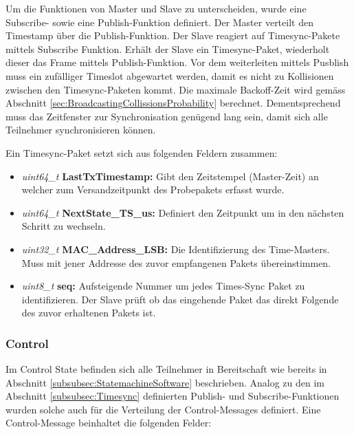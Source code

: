 Um die Funktionen von Master und Slave zu unterscheiden, wurde eine Subscribe- sowie eine Publish-Funktion definiert.
Der Master verteilt den Timestamp über die Publish-Funktion.
Der Slave reagiert auf Timesync-Pakete mittels Subscribe Funktion.
Erhält der Slave ein Timesync-Paket, wiederholt dieser das Frame mittels Publish-Funktion.
Vor dem weiterleiten mittels Pusblish muss ein zufälliger Timeslot abgewartet werden, damit es nicht zu Kollisionen zwischen den Timesync-Paketen kommt.
Die maximale Backoff-Zeit wird gemäss Abschnitt \ref{sec:BroadcastingCollissionsProbability} berechnet.
Dementsprechend muss das Zeitfenster zur Synchronisation genügend lang sein, damit sich alle Teilnehmer synchronisieren können.

Ein Timesync-Paket setzt sich aus folgenden Feldern zusammen: 

\begin{itemize}
\item \textit{uint64\_t} \textbf{LastTxTimestamp:}
	Gibt den Zeitstempel (Master-Zeit) an welcher zum Versandzeitpunkt des Probepakets erfasst wurde.
\item \textit{uint64\_t} \textbf{NextState\_TS\_us:}
	Definiert den Zeitpunkt um in den nächsten Schritt zu wechseln.
\item \textit{uint32\_t} \textbf{MAC\_Address\_LSB:}
	Die Identifizierung des Time-Masters. Muss mit jener Addresse des zuvor empfangenen Pakets übereinstimmen.
\item \textit{uint8\_t} \textbf{seq:}
	Aufsteigende Nummer um jedes Times-Sync Paket zu identifizieren. Der Slave prüft ob das eingehende Paket das direkt Folgende des zuvor erhaltenen Pakets ist.
\end{itemize}



\subsubsection{Control}\label{subsubsec:Control}
Im Control State befinden sich alle Teilnehmer in Bereitschaft wie bereits in Abschnitt \ref{subsubsec:StatemachineSoftware} beschrieben.
Analog zu den im Abschnitt \ref{subsubsec:Timesync} definierten Publish- und Subscribe-Funktionen wurden solche auch für die Verteilung der Control-Messages definiert.
Eine Control-Message beinhaltet die folgenden Felder:

